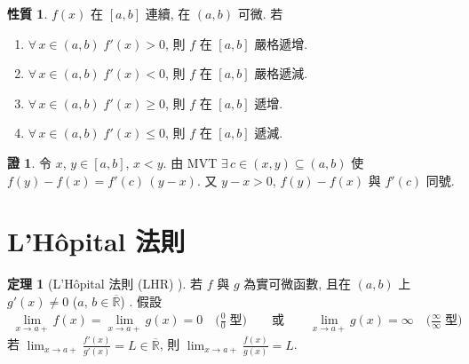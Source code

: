\documentclass[12pt,a4paper]{extarticle}
\newcommand{\ds}{\displaystyle}
\theoremstyle{definition}
\newtheorem*{prp}{性質}
\newtheorem*{fact}{結論}
\newtheorem*{thm}{定理}
\newtheorem*{ex}{例}
\newtheorem*{sol}{解}
\newtheorem*{prf}{證}
\begin{document}
\begin{prp}
  $f(x)$ 在 $[a, b]$ 連續, 在 $(a, b)$ 可微. 若
    \begin{enumerate}\setlength\itemsep{0em}
      \item $\ds\forall\,x\in(a, b)\; f'(x) > 0$, 則 $f$ 在 $[a, b]$ 嚴格遞增. 
      \item $\ds\forall\,x\in(a, b)\; f'(x) < 0$, 則 $f$ 在 $[a, b]$ 嚴格遞減. 
      \item $\ds\forall\,x\in(a, b)\; f'(x) \geqslant 0$, 則 $f$ 在 $[a, b]$ 遞增. 
      \item $\ds\forall\,x\in(a, b)\; f'(x) \leqslant 0$, 則 $f$ 在 $[a, b]$ 遞減. 
    \end{enumerate}
\end{prp}

\begin{prf}
  令 $\ds x$, $y\in[a, b]$, $x < y$. 由 MVT $\ds\exists\,c\in(x, y)\subseteq(a, b)$ 使 $\ds f(y) - f(x) = f'(c)\,(y - x)$. 又 $y - x > 0$, $f(y) - f(x)$ 與 $f'(c)$ 同號.  
\end{prf}

%
%

\section*{L'H\^opital 法則}

\begin{thm}[L'H\^opital 法則 (LHR) ]
  若 $f$ 與 $g$ 為實可微函數, 且在 $(a, b)$ 上 $g'(x)\ne 0$ ($a,\,b\in\overline{\mathbb{R}}$) . 假設 
  \begin{align*}
    \lim_{x\to a+}f(x) = \lim_{x\to a+}g(x) = 0\quad\Big(\frac{0}{0}\;\text{型}\Big)\qquad\text{或}\qquad\lim_{x\to a+}g(x) = \infty\quad\Big(\frac{\infty}{\infty}\;\text{型}\Big)
  \end{align*}
  若 $\ds\lim_{x\to a+}\frac{f'(x)}{g'(x)} = L\in\overline{\mathbb{R}}$, 則 $\ds\lim_{x\to a+}\frac{f(x)}{g(x)} = L$. 
\end{thm}
\end{document}
